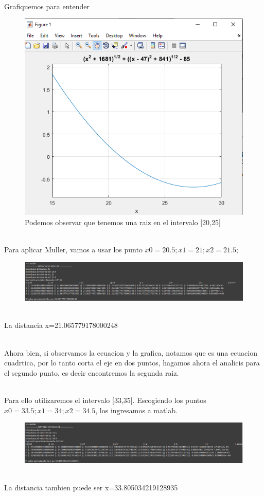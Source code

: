 \documentclass{article}
\theoremstyle{mytheoremstyle}
\theoremstyle{mytheoremstyle}
\theoremstyle{myproblemstyle}
\begin{document}
\noindent \\Grafiquemos para entender
\pagebreak
\begin{figure}[ht]
    \includegraphics[scale=0.8]{img/mul31_3.png}{\\Podemos observar que tenemos una raiz en el intervalo [20,25]}
\end{figure}
\\Para aplicar Muller, vamos a usar los punto $x0=20.5; x1=21; x2=21.5;$
\begin{figure}[ht]
    \includegraphics[scale=0.5]{img/mul31_4.png}
\end{figure}
\\La distancia x=21.065779178000248

\noindent \\Ahora bien, si observamos la ecuacion y la grafica, notamos que es una ecuacion cuadrtica, por lo tanto
corta el eje en dos puntos, hagamos ahora el analicis para el segundo punto, es decir encontremos la segunda raiz.

\noindent \\Para ello utilizaremos el intervalo [33,35]. Escogiendo los puntos $x0=33.5; x1=34; x2=34.5$, los ingresamos a matlab.
\pagebreak
\begin{figure}[ht]
    \includegraphics[scale=0.5]{img/mul31_5.png}
\end{figure}
\\La distancia tambien puede ser x=33.805034219128935
\end{document}
